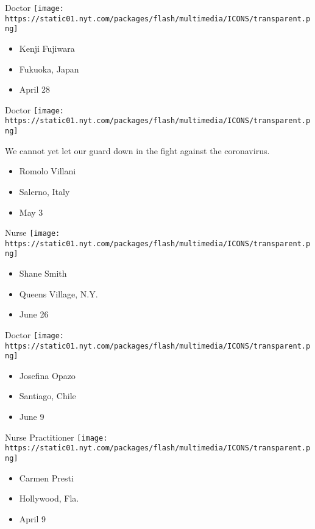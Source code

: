 Doctor
\texttt{[image: https://static01.nyt.com/packages/flash/multimedia/ICONS/transparent.png]}

\begin{itemize}
\tightlist
\item
  Kenji Fujiwara
\item
  Fukuoka, Japan
\item
  April 28
\end{itemize}

\protect\hyperlink{item-romolo-villani}{}

Doctor
\texttt{[image: https://static01.nyt.com/packages/flash/multimedia/ICONS/transparent.png]}

We cannot yet let our guard down in the fight against the coronavirus.

\begin{itemize}
\tightlist
\item
  Romolo Villani
\item
  Salerno, Italy
\item
  May 3
\end{itemize}

\protect\hyperlink{item-shane-smith}{}

Nurse
\texttt{[image: https://static01.nyt.com/packages/flash/multimedia/ICONS/transparent.png]}

\begin{itemize}
\tightlist
\item
  Shane Smith
\item
  Queens Village, N.Y.
\item
  June 26
\end{itemize}

\protect\hyperlink{item-josefina-opazo}{}

Doctor
\texttt{[image: https://static01.nyt.com/packages/flash/multimedia/ICONS/transparent.png]}

\begin{itemize}
\tightlist
\item
  Josefina Opazo
\item
  Santiago, Chile
\item
  June 9
\end{itemize}

\protect\hyperlink{item-carmen-presti}{}

Nurse Practitioner
\texttt{[image: https://static01.nyt.com/packages/flash/multimedia/ICONS/transparent.png]}

\begin{itemize}
\tightlist
\item
  Carmen Presti
\item
  Hollywood, Fla.
\item
  April 9
\end{itemize}

